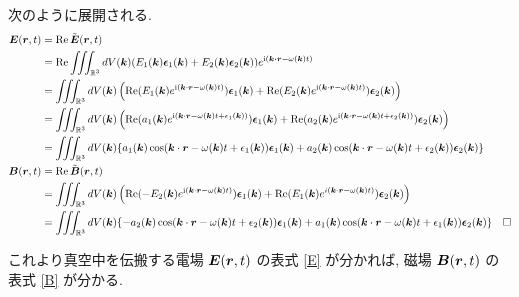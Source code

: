 \documentclass[a4paper,dvipdfmx]{jsarticle}
\theoremstyle{definition}
\begin{document}
次のように展開される.
\begin{align}
  \EE(\rr, t) & = \Re\tilde{\EE}(\rr, t)                                                                                                                                                                                          \\
              & = \Re\iiint_{\RR^3} dV(\kk)(E_1(\kk)\ee_1(\kk) + E_2(\kk)\ee_2(\kk))e^{\ii(\kk\vdot\rr - \omega(\kk)t)}                                                                                                           \\
              & = \iiint_{\RR^3} dV(\kk)\left(\Re(E_1(\kk)e^{\ii(\kk\cdot\rr - \omega(\kk)t)})\ee_1(\kk) + \Re(E_2(\kk)e^{\ii(\kk\cdot\rr - \omega(\kk)t)})\ee_2(\kk)\right)                                                      \\
              & = \iiint_{\RR^3} dV(\kk)\left(\Re(a_1(\kk)e^{\ii(\kk\cdot\rr - \omega(\kk)t + \epsilon_1(\kk))})\ee_1(\kk) + \Re(a_2(\kk)e^{\ii(\kk\cdot\rr - \omega(\kk)t + \epsilon_2(\kk))})\ee_2(\kk)\right)                  \\
              & = \iiint_{\RR^3} dV(\kk)\lbrace a_1(\kk)\cos(\kk\cdot\rr - \omega(\kk)t + \epsilon_1(\kk))\ee_1(\kk) + a_2(\kk)\cos(\kk\cdot\rr - \omega(\kk)t + \epsilon_2(\kk))\ee_2(\kk)\rbrace \label{E}                      \\
  \BB(\rr, t) & = \Re\tilde{\BB}(\rr, t)                                                                                                                                                                                          \\
              & = \iiint_{\RR^3} dV(\kk)\left(\Re(-E_2(\kk)e^{\ii(\kk\cdot\rr - \omega(\kk)t)})\ee_1(\kk) + \Re(E_1(\kk)e^{i(\kk\cdot\rr - \omega(\kk)t)})\ee_2(\kk)\right)                                                       \\
              & = \iiint_{\RR^3} dV(\kk)\lbrace -a_2(\kk)\cos(\kk\cdot\rr - \omega(\kk)t + \epsilon_2(\kk))\ee_1(\kk) + a_1(\kk)\cos(\kk\cdot\rr - \omega(\kk)t + \epsilon_1(\kk))\ee_2(\kk)\rbrace              & \Box \label{B}
\end{align}

これより真空中を伝搬する電場 $\vb*{E}(\vb*{r}, t)$ の表式 \eqref{E} が分かれば, 磁場 $\vb*{B}(\vb*{r}, t)$ の表式 \eqref{B} が分かる. \\
\end{document}
